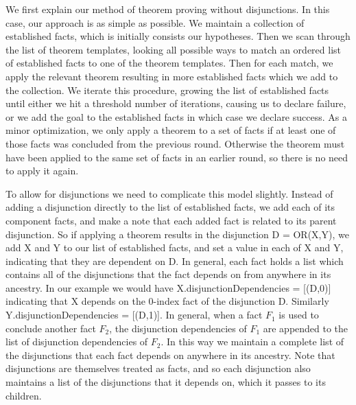 \documentclass[11pt,
oneside]{article} %
\begin{document}
We first explain our method of theorem proving without disjunctions.
In this case, our approach is as simple as possible. We maintain a
collection of established facts, which is initially consists our
hypotheses.  Then we scan through the list of theorem templates,
looking all possible ways to match an ordered list of established
facts to one of the theorem templates.  Then for each match, we apply
the relevant theorem resulting in more established facts which we add
to the collection.  We iterate this procedure, growing the list of
established facts until either we hit a threshold number of
iterations, causing us to declare failure, or we add the goal to the
established facts in which case we declare success.  As a minor
optimization, we only apply a theorem to a set of facts if at least
one of those facts was concluded from the previous round.  Otherwise
the theorem must have been applied to the same set of facts in an
earlier round, so there is no need to apply it again.

To allow for disjunctions we need to complicate this model slightly.
Instead of adding a disjunction directly to the list of established
facts, we add each of its component facts, and make a note that each
added fact is related to its parent disjunction.  So if applying a
theorem results in the disjunction D = OR(X,Y), we add X and Y to our
list of established facts, and set a value in each of X and Y,
indicating that they are dependent on D.  In general, each fact holds
a list which contains all of the disjunctions that the fact depends on
from anywhere in its ancestry.  In our example we would have
X.disjunctionDependencies = [(D,0)] indicating that X depends on the
0-index fact of the disjunction D.  Similarly
Y.disjunctionDependencies = [(D,1)].  In general, when a fact $F_1$ is
used to conclude another fact $F_2$, the disjunction dependencies of
$F_1$ are appended to the list of disjunction dependencies of $F_2$.
In this way we maintain a complete list of the disjunctions that each
fact depends on anywhere in its ancestry.  Note that disjunctions are
themselves treated as facts, and so each disjunction also maintains a
list of the disjunctions that it depends on, which it passes to its
children.
\end{document}
